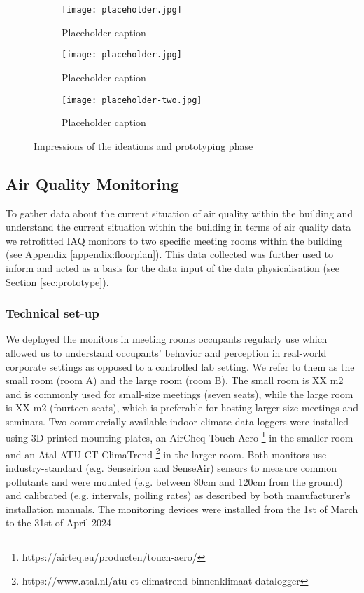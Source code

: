 \begin{figure*}[!t]
    \centering
    \begin{subfigure}[b]{0.23\textwidth}
        \texttt{[image: placeholder.jpg]}
        \caption{Placeholder caption}
        \label{fig:1}
    \end{subfigure}
    \hfill
    \begin{subfigure}[b]{0.23\textwidth}
        \texttt{[image: placeholder.jpg]}
        \caption{Placeholder caption}
        \label{fig:2}
    \end{subfigure}
    \hfill
    \begin{subfigure}[b]{0.5\textwidth}
        \texttt{[image: placeholder-two.jpg]}
        \caption{Placeholder caption}
        \label{fig:3_4_combined}
    \end{subfigure}
    \caption{Impressions of the ideations and prototyping phase}
    \label{fig:full_width}
\end{figure*}

\subsection{Air Quality Monitoring}
\label{sec:monitoring}

To gather data about the current situation of air quality within the building and understand the current situation within the building in terms of air quality data we retrofitted IAQ monitors to two specific meeting rooms within the building (see \hyperref[appendix:floorplan]{Appendix \ref*{appendix:floorplan}}). This data collected was further used to inform and acted as a basis for the data input of the data physicalisation (see \hyperref[sec:prototype]{Section \ref*{sec:prototype}}).

\subsubsection{Technical set-up}

We deployed the monitors in meeting rooms occupants regularly use which allowed us to understand occupants' behavior and perception in real-world corporate settings as opposed to a controlled lab setting. We refer to them as the small room (room A) and the large room (room B). The small room is XX m2 and is commonly used for small-size meetings (seven seats), while the large room is XX m2 (fourteen seats), which is preferable for hosting larger-size meetings and seminars. Two commercially available indoor climate data loggers were installed using 3D printed mounting plates, an AirCheq Touch Aero \footnote{https://airteq.eu/producten/touch-aero/} in the smaller room and an Atal ATU-CT ClimaTrend \footnote{https://www.atal.nl/atu-ct-climatrend-binnenklimaat-datalogger} in the larger room. Both monitors use industry-standard (e.g. Senseirion and SenseAir) sensors to measure common pollutants and were mounted (e.g. between 80cm and 120cm from the ground) and calibrated (e.g. intervals, polling rates) as described by both manufacturer's installation manuals. The monitoring devices were installed from the 1st of March to the 31st of April 2024

